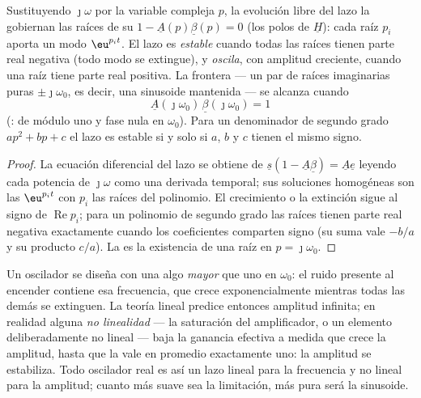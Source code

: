 \begin{theorem}\label{thm:b2:feedback-oscillators:stability}
Sustituyendo $\jmath\omega$ por la variable compleja $p$, la evolución libre
del lazo la gobiernan las raíces de su \emph{}
$1 - \underline A(p)\underline\beta(p) = 0$ (los polos de $\underline H$): cada raíz
$p_i$ aporta un modo $\eu^{p_it}$. El lazo es \emph{estable} cuando todas
las raíces tienen parte real negativa (todo modo se extingue), y
\emph{oscila}, con amplitud creciente, cuando una raíz tiene parte real
positiva. La frontera --- un par de raíces imaginarias puras $\pm\jmath
\omega_0$, es decir, una sinusoide mantenida --- se alcanza cuando
\[
\underline A(\jmath\omega_0)\,\underline\beta(\jmath\omega_0) = 1
\]
(\emph{}:  de módulo uno y fase
nula en $\omega_0$). Para un denominador de segundo grado $ap^2 + bp + c$ el
lazo es estable si y solo si $a$, $b$ y $c$ tienen el mismo signo.
\end{theorem}

\begin{proof}
La ecuación diferencial del lazo se obtiene de $\underline s(1 -
\underline A\underline\beta) = \underline A\underline e$ leyendo cada potencia de $\jmath\omega$
como una derivada temporal; sus soluciones homogéneas son las $\eu^{p_it}$
con $p_i$ las raíces del polinomio. El crecimiento o la extinción sigue al
signo de $\operatorname{Re}p_i$; para un polinomio de segundo grado las
raíces tienen parte real negativa exactamente cuando los coeficientes
comparten signo (su suma vale $-b/a$ y su producto $c/a$). La  es la existencia de una raíz en $p = \jmath\omega_0$.
\end{proof}

\begin{remark}\label{rem:b2:feedback-oscillators:start}
Un oscilador se diseña con una  algo \emph{mayor} que uno
en $\omega_0$: el ruido presente al encender contiene esa frecuencia, que
crece exponencialmente mientras todas las demás se extinguen. La teoría
lineal predice entonces amplitud infinita; en realidad alguna
\emph{no linealidad} --- la saturación del amplificador, o un elemento
deliberadamente no lineal --- baja la ganancia efectiva a medida que crece
la amplitud, hasta que la  vale en promedio exactamente
uno: la amplitud se estabiliza. Todo oscilador real es así un lazo lineal
para la frecuencia y no lineal para la amplitud; cuanto más suave sea la
limitación, más pura será la sinusoide.
\end{remark}

